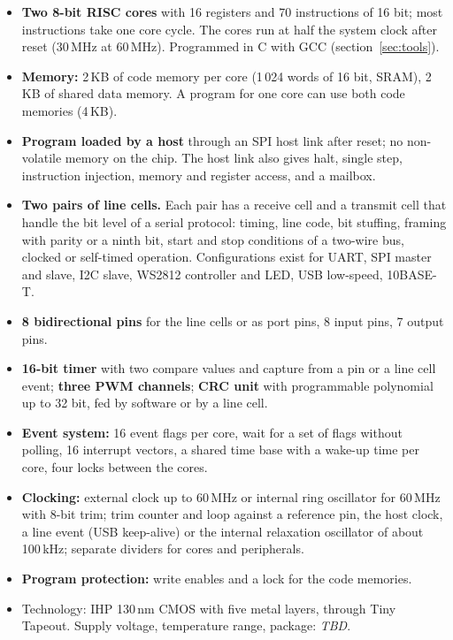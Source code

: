 \documentclass[10pt,a4paper]{article}
\newcommand{\tbd}{\textcolor{black!50}{\textit{TBD}}}
\begin{document}
\begin{itemize}
\item \textbf{Two 8-bit RISC cores} with 16 registers and 70 instructions of 16 bit; most instructions take one
core cycle. The cores run at half the system clock after reset (30\,MHz at 60\,MHz). Programmed in C with GCC (section~\ref{sec:tools}).
\item \textbf{Memory:} 2\,KB of code memory per core (1\,024 words of 16 bit, SRAM), 2\,KB of shared data memory.
A program for one core can use both code memories (4\,KB).
\item \textbf{Program loaded by a host} through an SPI host link after reset; no non-volatile memory on the chip.
The host link also gives halt, single step, instruction injection, memory and register access, and a mailbox.
\item \textbf{Two pairs of line cells.} Each pair has a receive cell and a transmit cell that handle the bit level
of a serial protocol: timing, line code, bit stuffing, framing with parity or a ninth bit, start and stop conditions of a two-wire bus, clocked or self-timed operation. Configurations
exist for UART, SPI master and slave, I2C slave, WS2812 controller and LED, USB low-speed, 10BASE-T.
\item \textbf{8 bidirectional pins} for the line cells or as port pins, 8 input pins, 7 output pins.
\item \textbf{16-bit timer} with two compare values and capture from a pin or a line cell event; \textbf{three PWM
channels}; \textbf{CRC unit} with programmable polynomial up to 32 bit, fed by software or by a line cell.
\item \textbf{Event system:} 16 event flags per core, wait for a set of flags without polling, 16 interrupt
vectors, a shared time base with a wake-up time per core, four locks between the cores.
\item \textbf{Clocking:} external clock up to 60\,MHz or internal ring oscillator for 60\,MHz with 8-bit trim; trim counter
and loop against a reference pin, the host clock, a line event (USB keep-alive) or the internal relaxation
oscillator of about 100\,kHz; separate dividers for
cores and peripherals.
\item \textbf{Program protection:} write enables and a lock for the code memories.
\item Technology: IHP 130\,nm CMOS with five metal layers, through Tiny Tapeout. Supply voltage, temperature range, package: \tbd.
\end{itemize}
\end{document}

